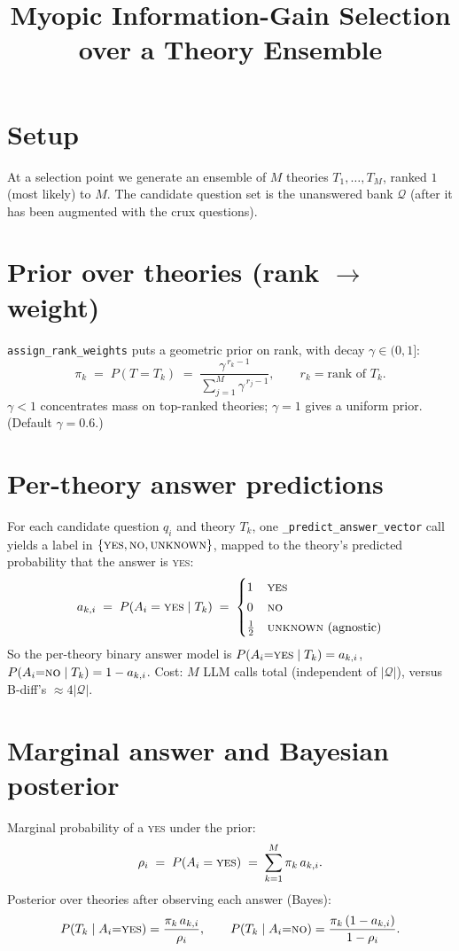 \documentclass[11pt]{article}
\title{Myopic Information-Gain Selection over a Theory Ensemble}
\author{}
\date{}
\newcommand{\YES}{\textsc{yes}}
\newcommand{\NO}{\textsc{no}}
\newcommand{\UNK}{\textsc{unknown}}
\begin{document}
\maketitle

\section*{Setup}

At a selection point we generate an ensemble of $M$ theories $T_1,\dots,T_M$,
ranked $1$ (most likely) to $M$. The candidate question set is the unanswered
bank $\mathcal{Q}$ (after it has been augmented with the crux questions).

\section{Prior over theories (rank $\to$ weight)}

\texttt{assign\_rank\_weights} puts a geometric prior on rank, with decay
$\gamma \in (0,1]$:
\[
\pi_k \;=\; P(T = T_k) \;=\; \frac{\gamma^{\,r_k - 1}}{\sum_{j=1}^{M}\gamma^{\,r_j - 1}},
\qquad r_k = \text{rank of } T_k .
\]
$\gamma < 1$ concentrates mass on top-ranked theories; $\gamma = 1$ gives a
uniform prior. (Default $\gamma = 0.6$.)

\section{Per-theory answer predictions}

For each candidate question $q_i$ and theory $T_k$, one
\texttt{\_predict\_answer\_vector} call yields a label in
$\{\YES, \NO, \UNK\}$, mapped to the theory's predicted probability that the
answer is \YES:
\[
a_{k,i} \;=\; P(A_i = \YES \mid T_k) \;=\;
\begin{cases}
1 & \YES \\[2pt]
0 & \NO \\[2pt]
\tfrac12 & \UNK \ (\text{agnostic})
\end{cases}
\]
So the per-theory binary answer model is $P(A_i{=}\YES \mid T_k) = a_{k,i}$,
$P(A_i{=}\NO \mid T_k) = 1 - a_{k,i}$. Cost: $M$ LLM calls total (independent
of $|\mathcal{Q}|$), versus B-diff's $\approx 4|\mathcal{Q}|$.

\section{Marginal answer and Bayesian posterior}

Marginal probability of a \YES{} under the prior:
\[
\rho_i \;=\; P(A_i = \YES) \;=\; \sum_{k=1}^{M}\pi_k\, a_{k,i}.
\]
Posterior over theories after observing each answer (Bayes):
\[
P(T_k \mid A_i{=}\YES) = \frac{\pi_k\, a_{k,i}}{\rho_i},
\qquad
P(T_k \mid A_i{=}\NO) = \frac{\pi_k\,(1 - a_{k,i})}{1 - \rho_i}.
\]
\end{document}
